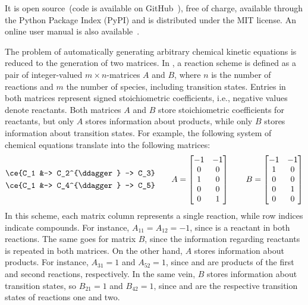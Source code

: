 It is open source~(code is available on GitHub~\cite{overreact2021zenodo,overreactguide2022}),
free of charge,
available through the Python Package Index (PyPI) and is
distributed under the MIT license.
An online user manual is also
available~\cite{overreactguide2022}.

The problem of automatically generating arbitrary chemical kinetic equations is reduced to the generation of two matrices.
In \overreact,
a reaction scheme is defined as a pair of integer-valued $m \times n$-matrices $A$ and $B$,
where $n$ is the number of reactions and $m$ the number of species,
including transition states.
Entries in both matrices represent signed stoichiometric coefficients,
i.e.,
negative values denote reactants.
Both matrices $A$ and $B$ store stoichiometric coefficients for reactants,
but only $A$ stores information about products,
while only $B$ stores information about transition states.
For example,
the following system of chemical equations translate into the following matrices:
% 
\begin{equation}
	\begin{split}
		\ce{C_1 &-> C_2^{\ddagger} -> C_3} \\
		\ce{C_1 &-> C_4^{\ddagger} -> C_5} \\
	\end{split}
	\qquad
	A = \begin{bmatrix}
		-1 & -1 \\
		0  & 0  \\
		1  & 0  \\
		0  & 0  \\
		0  & 1
	\end{bmatrix}
	\qquad
	B = \begin{bmatrix}
		-1 & -1 \\
		1  & 0  \\
		0  & 0  \\
		0  & 1  \\
		0  & 0
	\end{bmatrix}
\end{equation}
% 
In this scheme,
each matrix column represents a single reaction,
while row indices indicate compounds.
For instance,
$A_{11} = A_{12} = -1$,
since  is a reactant in both reactions.
The same goes for matrix $B$,
since the information regarding reactants is repeated in both matrices.
On the other hand,
$A$ stores information about products.
For instance,
$A_{31} = 1$ and $A_{52} = 1$,
since  and  are products of the first and second reactions,
respectively.
In the same vein,
$B$ stores information about transition states,
so $B_{21} = 1$ and $B_{42} = 1$,
since  and  are the respective transition states of reactions one and two.

